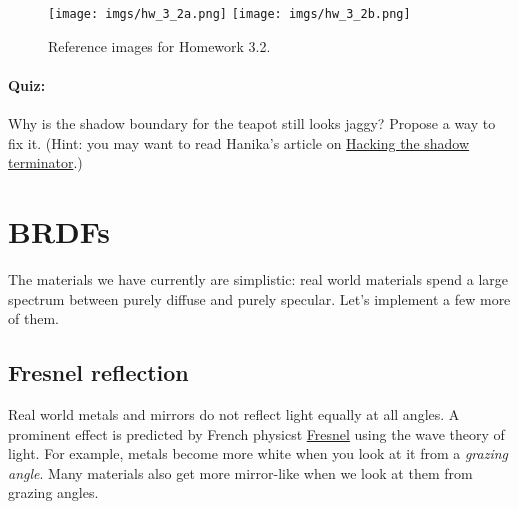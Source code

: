 \begin{figure}[ht]
    \centering
    \texttt{[image: imgs/hw\_3\_2a.png]}
    \texttt{[image: imgs/hw\_3\_2b.png]}
    \caption{Reference images for Homework 3.2.}
    \label{fig:hw_3_2}
\end{figure}

\paragraph{Quiz:} Why is the shadow boundary for the teapot still looks jaggy? Propose a way to fix it. (Hint: you may want to read Hanika's article on \href{https://jo.dreggn.org/home/2021_terminator.pdf}{Hacking the shadow terminator}.)

\section{BRDFs}
The materials we have currently are simplistic: real world materials spend a large spectrum between purely diffuse and purely specular. Let's implement a few more of them.

\subsection{Fresnel reflection}
Real world metals and mirrors do not reflect light equally at all angles. A prominent effect is predicted by French physicst \href{https://en.wikipedia.org/wiki/Augustin-Jean_Fresnel}{Fresnel} using the wave theory of light. For example, metals become more white when you look at it from a \emph{grazing angle}. Many materials also get more mirror-like when we look at them from grazing angles.

